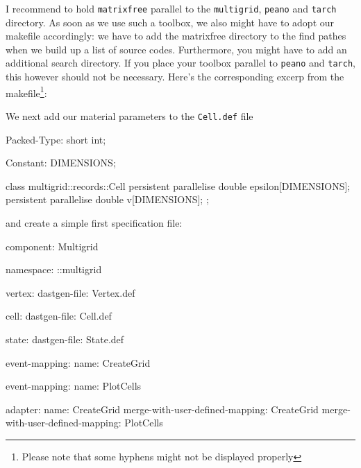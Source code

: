 \noindent
I recommend to hold \texttt{matrixfree} parallel to the \texttt{multigrid},
\texttt{peano} and \texttt{tarch} directory.
As soon as we use such a toolbox, we also might have to adopt our makefile
accordingly: we have to add the matrixfree directory to the find pathes when we
build up a list of source codes.
Furthermore, you might have to add an additional search directory. If you place
your toolbox parallel to \texttt{peano} and \texttt{tarch}, this however should
not be necessary.
Here's the corresponding excerp from the makefile\footnote{Please note that some hyphens might not be displayed properly}:

\noindent
We next add our material parameters to the \texttt{Cell.def} file
\begin{code}
Packed-Type: short int;

Constant: DIMENSIONS;

class multigrid::records::Cell {  
  persistent parallelise double   epsilon[DIMENSIONS];
  persistent parallelise double   v[DIMENSIONS];
};
\end{code}

\noindent
and create a simple first specification file:
\begin{code}
component: Multigrid

namespace: ::multigrid

vertex:
  dastgen-file: Vertex.def
  
cell:
  dastgen-file: Cell.def

state:
  dastgen-file: State.def

event-mapping:
  name: CreateGrid

event-mapping:
  name: PlotCells

adapter:
  name: CreateGrid
  merge-with-user-defined-mapping: CreateGrid
  merge-with-user-defined-mapping: PlotCells
  
\end{code}

